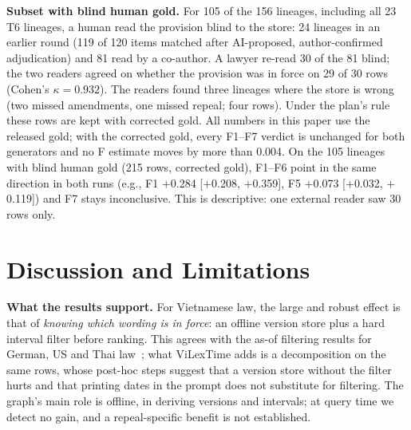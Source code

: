 \documentclass[conference]{IEEEtran}
\begin{document}
\textbf{Subset with blind human gold.} For 105 of the 156 lineages, including all 23 T6 lineages, a human read the provision blind to the store: 24 lineages in an earlier round (119 of 120 items matched after AI-proposed, author-confirmed adjudication) and 81 read by a co-author. A lawyer re-read 30 of the 81 blind; the two readers agreed on whether the provision was in force on 29 of 30 rows (Cohen's $\kappa=0.932$). The readers found three lineages where the store is wrong (two missed amendments, one missed repeal; four rows). Under the plan's rule these rows are kept with corrected gold. All numbers in this paper use the released gold; with the corrected gold, every F1--F7 verdict is unchanged for both generators and no F estimate moves by more than 0.004. On the 105 lineages with blind human gold (215 rows, corrected gold), F1--F6 point in the same direction in both runs (e.g., F1 $+$0.284 [$+$0.208, $+$0.359], F5 $+$0.073 [$+$0.032, $+$0.119]) and F7 stays inconclusive. This is descriptive: one external reader saw 30 rows only.

\section{Discussion and Limitations}
\label{sec:discussion}

\textbf{What the results support.} For Vietnamese law, the large and robust effect is that of \emph{knowing which wording is in force}: an offline version store plus a hard interval filter before ranking. This agrees with the as-of filtering results for German, US and Thai law~\cite{prior2026oldfriend,yao2026lawinforce,akarajaradwong2026nitibenchplus}; what ViLexTime adds is a decomposition on the same rows, whose post-hoc steps suggest that a version store without the filter hurts and that printing dates in the prompt does not substitute for filtering. The graph's main role is offline, in deriving versions and intervals; at query time we detect no gain, and a repeal-specific benefit is not established.
\end{document}
